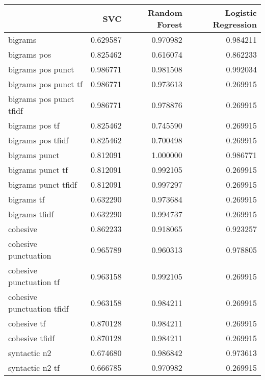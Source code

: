 \begin{tabular}{lrrr}
\toprule
{} &       SVC &  Random Forest &  Logistic Regression \\
\midrule
bigrams                    &  0.629587 &       0.970982 &             0.984211 \\
bigrams pos                &  0.825462 &       0.616074 &             0.862233 \\
bigrams pos punct          &  0.986771 &       0.981508 &             0.992034 \\
bigrams pos punct tf       &  0.986771 &       0.973613 &             0.269915 \\
bigrams pos punct tfidf    &  0.986771 &       0.978876 &             0.269915 \\
bigrams pos tf             &  0.825462 &       0.745590 &             0.269915 \\
bigrams pos tfidf          &  0.825462 &       0.700498 &             0.269915 \\
bigrams punct              &  0.812091 &       1.000000 &             0.986771 \\
bigrams punct tf           &  0.812091 &       0.992105 &             0.269915 \\
bigrams punct tfidf        &  0.812091 &       0.997297 &             0.269915 \\
bigrams tf                 &  0.632290 &       0.973684 &             0.269915 \\
bigrams tfidf              &  0.632290 &       0.994737 &             0.269915 \\
cohesive                   &  0.862233 &       0.918065 &             0.923257 \\
cohesive punctuation       &  0.965789 &       0.960313 &             0.978805 \\
cohesive punctuation tf    &  0.963158 &       0.992105 &             0.269915 \\
cohesive punctuation tfidf &  0.963158 &       0.984211 &             0.269915 \\
cohesive tf                &  0.870128 &       0.984211 &             0.269915 \\
cohesive tfidf             &  0.870128 &       0.984211 &             0.269915 \\
syntactic n2               &  0.674680 &       0.986842 &             0.973613 \\
syntactic n2 tf            &  0.666785 &       0.970982 &             0.269915 \\

\end{tabular}

